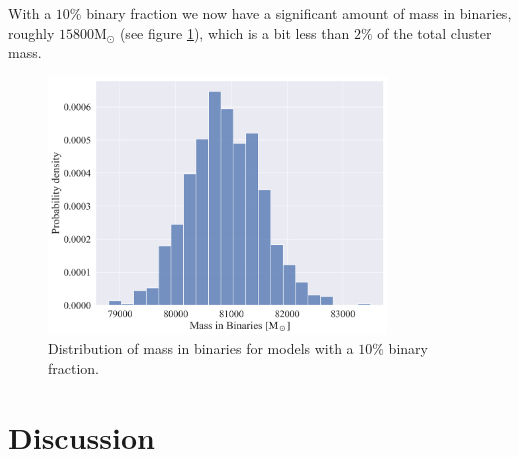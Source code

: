 With a $10\%$ binary fraction we now have a significant amount of mass in binaries, roughly $15800
	\mathrm{M_\odot}$ (see figure \ref{fig:high_bin_model_Bin_mass}), which is a bit less than $2\%$ of
the total cluster mass.

\begin{figure}
	\centering
	\includegraphics[width=0.8\textwidth]{figures/high_bin_model/binary_mass.png}
	\caption{Distribution of mass in binaries for models with a $10\%$ binary fraction.}
	\label{fig:high_bin_model_Bin_mass}
\end{figure}





\section{Discussion}








